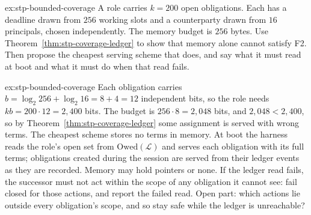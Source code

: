 \begin{pdexercise}[kind=Open,rating=3]{ex:stp-bounded-coverage}
A role carries $k=200$ open obligations. Each has a deadline drawn from $256$
working slots and a counterparty drawn from $16$ principals, chosen
independently. The memory budget is $256$ bytes. Use
Theorem~\ref{thm:stp-coverage-ledger} to show that memory alone cannot satisfy
F2. Then propose the cheapest serving scheme that does, and say what it must
read at boot and what it must do when that read fails.
\end{pdexercise}
\begin{pdsolution}{ex:stp-bounded-coverage}
Each obligation carries $b=\log_2 256+\log_2 16=8+4=12$ independent bits, so
the role needs $kb=200\cdot 12=2{,}400$ bits. The budget is
$256\cdot 8=2{,}048$ bits, and $2{,}048<2{,}400$, so by
Theorem~\ref{thm:stp-coverage-ledger} some assignment is served with wrong terms.
The cheapest scheme stores no terms in memory. At boot the harness reads the
role's open set from $\mathrm{Owed}(\mathcal{L})$ and serves each obligation with its full
terms; obligations created during the session are served from their ledger
events as they are recorded. Memory may hold pointers or none. If the ledger
read fails, the successor must not act within the scope of any obligation it
cannot see: fail closed for those actions, and report the failed read. Open
part: which actions lie outside every obligation's scope, and so stay safe while
the ledger is unreachable?
\end{pdsolution}
